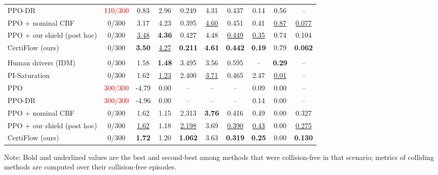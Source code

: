 \begin{table}[t]
\begin{tabular*}{\textwidth}{@{\extracolsep{\fill}}l ccccccccc@{}}
\quad PPO-DR & \textcolor{red}{110/300} & 0.83 & 2.96 & 0.249 & 4.31 & 0.437 & 0.14 & 0.56 & --\\
\quad PPO + nominal CBF & 0/300 & 3.17 & 4.23 & 0.395 & \underline{4.60} & 0.451 & 0.41 & \underline{0.87} & \underline{0.077}\\
\quad PPO + our shield (post hoc) & 0/300 & \underline{3.48} & \textbf{4.36} & 0.427 & 4.48 & \underline{0.449} & \underline{0.35} & 0.74 & 0.104\\
\quad CertiFlow (ours) & 0/300 & \textbf{3.50} & \underline{4.27} & \textbf{0.211} & \textbf{4.61} & \textbf{0.442} & \textbf{0.19} & 0.79 & \textbf{0.062}\\
\addlinespace[2pt]
\multicolumn{10}{@{}l}{\textit{S3 emergency braking}}\\
\quad Human drivers (IDM) & 0/300 & 1.58 & \textbf{1.48} & 3.495 & 3.56 & 0.595 & -- & \textbf{0.29} & --\\
\quad PI-Saturation & 0/300 & 1.62 & \underline{1.23} & 2.400 & \underline{3.71} & 0.465 & 2.47 & \underline{0.01} & --\\
\quad PPO & \textcolor{red}{300/300} & -4.79 & 0.00 & -- & -- & -- & 0.09 & 0.00 & --\\
\quad PPO-DR & \textcolor{red}{300/300} & -4.96 & 0.00 & -- & -- & -- & 0.14 & 0.00 & --\\
\quad PPO + nominal CBF & 0/300 & 1.62 & 1.15 & 2.313 & \textbf{3.76} & 0.416 & 0.49 & 0.00 & 0.327\\
\quad PPO + our shield (post hoc) & 0/300 & \underline{1.62} & 1.18 & \underline{2.198} & 3.69 & \underline{0.390} & \underline{0.43} & 0.00 & \underline{0.275}\\
\quad CertiFlow (ours) & 0/300 & \textbf{1.72} & 1.20 & \textbf{1.062} & 3.63 & \textbf{0.319} & \textbf{0.25} & 0.00 & \textbf{0.130}\\
\bottomrule
\end{tabular*}
\par\smallskip\raggedright\scriptsize Note: Bold and underlined values are the best and second-best among methods that were collision-free in that scenario; metrics of colliding methods are computed over their collision-free episodes.
\end{table}
